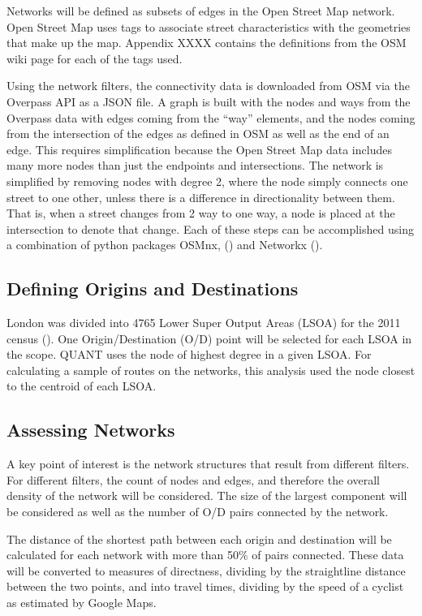 Networks will be defined as subsets of edges in the Open Street Map network. Open Street Map uses tags to associate street characteristics with the geometries that make up the map. Appendix XXXX contains the definitions from the OSM wiki page for each of the tags used.  

Using the network filters, the connectivity data is downloaded from OSM via the Overpass API as a JSON file. A graph is built with the nodes and ways from the Overpass data with edges coming from the ``way'' elements, and the nodes coming from the intersection of the edges as defined in OSM as well as the end of an edge. This requires simplification because the Open Street Map data includes many more nodes than just the endpoints and intersections. The network is simplified by removing nodes with degree 2, where the node simply connects one street to one other, unless there is a difference in directionality between them. That is, when a street changes from 2 way to one way, a node is placed at the intersection to denote that change.  Each of these steps can be accomplished using a combination of python packages OSMnx, (\cite{osmnx}) and Networkx (\cite{networkx}).

\subsection{Defining Origins and Destinations}
London was divided into 4765 Lower Super Output Areas (LSOA) for the 2011 census (\cite{lsoa}). One Origin/Destination (O/D) point will be selected for each LSOA in the scope. QUANT uses the node of highest degree in a given LSOA. For calculating a sample of routes on the networks, this analysis used the node closest to the centroid of each LSOA. 

\subsection{Assessing Networks}

A key point of interest is the network structures that result from different filters. For different filters, the count of nodes and edges, and therefore the overall density of the network will be considered. The size of the largest component will be considered as well as the number of O/D pairs connected by the network. 

The distance of the shortest path between each origin and destination will be calculated for each network with more than 50\% of pairs connected. These data will be converted to measures of directness, dividing by the straightline distance between the two points, and into travel times, dividing by the speed of a cyclist as estimated by Google Maps. 

